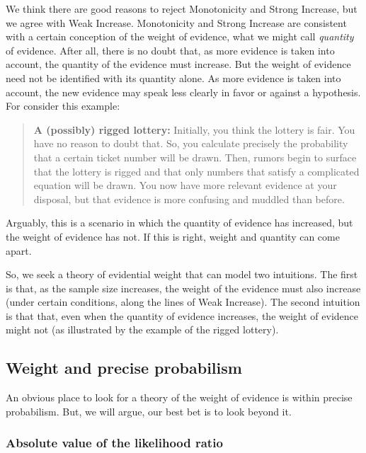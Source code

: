 \documentclass[
  10pt,
  dvipsnames,enabledeprecatedfontcommands]{scrartcl}
\begin{document}
\noindent We think there are good reasons to reject Monotonicity and
Strong Increase, but we agree with Weak Increase. Monotonicity and
Strong Increase are consistent with a certain conception of the weight
of evidence, what we might call \emph{quantity} of evidence. After all,
there is no doubt that, as more evidence is taken into account, the
quantity of the evidence must increase. But the weight of evidence need
not be identified with its quantity alone. As more evidence is taken
into account, the new evidence may speak less clearly in favor or
against a hypothesis. For consider this example:

\begin{quote}
\textbf{A (possibly) rigged lottery:} Initially, you think the lottery  is  fair. You have no reason to doubt that. So, you calculate precisely the probability that a certain ticket number will be drawn. Then, rumors begin to surface that the lottery is rigged and that only numbers that satisfy a complicated equation will be drawn. You now have more relevant evidence at your disposal, but that evidence is more confusing and muddled than before. 
\end{quote}

\noindent Arguably, this is a scenario in which the quantity of evidence
has increased, but the weight of evidence has not. If this is right,
weight and quantity can come apart.

So, we seek a theory of evidential weight that can model two intuitions.
The first is that, as the sample size increases, the weight of the
evidence must also increase (under certain conditions, along the lines
of Weak Increase). The second intuition is that that, even when the
quantity of evidence increases, the weight of evidence might not (as
illustrated by the example of the rigged lottery).

\hypertarget{weight-and-precise-probabilism}{%
\subsection{Weight and precise
probabilism}\label{weight-and-precise-probabilism}}

An obvious place to look for a theory of the weight of evidence is
within precise probabilism. But, we will argue, our best bet is to look
beyond it.

\hypertarget{absolute-value-of-the-likelihood-ratio}{%
\subsubsection{Absolute value of the likelihood
ratio}\label{absolute-value-of-the-likelihood-ratio}}
\end{document}
